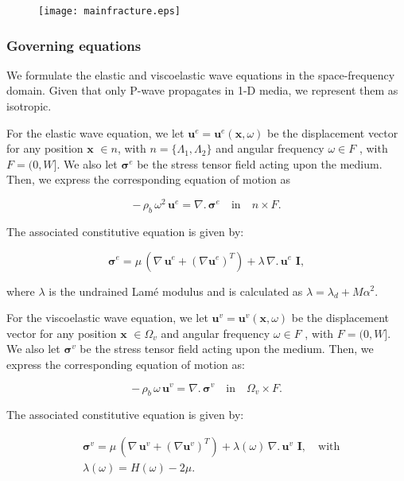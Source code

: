 \documentclass[draft]{agujournal2019}
\begin{document}
 \begin{figure}[!ht]
\centering
        \texttt{[image: mainfracture.eps]}
\caption{
}
\label{fig.3}
\end{figure}

\subsubsection{Governing equations}
We formulate the elastic and viscoelastic wave equations in the space-frequency domain. Given that only P-wave propagates in  1-D media, we represent them as isotropic.

For the elastic wave equation, we let $\bm{u}^e=\bm{u}^e (\bm{x},\omega)$ be the displacement vector for any position $\bm{x}$ $\in n$, with  $n= \{\Lambda_1, \Lambda_2\} $ and angular frequency  $\omega \in F$ , with $F =(0,W]$. We also let $\bm{\sigma}^e$ be the stress tensor field acting upon the medium. Then, we express the corresponding equation of motion as
\begin{linenomath*}
\begin{equation}\label{Eq.6}
- \, \rho_b \,\omega^2 \, \bm{u}^e = \nabla . \, \bm{\sigma}^e \quad  \textrm{in} \quad n \times F.
\end{equation}
\end{linenomath*}
The associated constitutive equation is given by: 
\begin{linenomath*}
\begin{equation}\label{Eq.7}
\bm{\sigma}^e = \mu \,  \left( \nabla \, \bm{u}^e + ({\nabla  \bm{u}^e})^T  \right) + \lambda \,  \nabla . \, \bm{u}^e\,\, \bm{I},
\end{equation}
\end{linenomath*}
where $\lambda$ is the undrained Lamé modulus and is calculated as $\lambda = \lambda_d + M \alpha^2$.

For the viscoelastic wave equation, we let $\bm{u}^v=\bm{u}^v (\bm{x},\omega)$ be the displacement vector for any position $\bm{x}$  $ \in \Omega_v$ and angular frequency $\omega \in F$ , with $F =(0,W]$. We also let $\bm{\sigma}^v$ be the stress tensor field acting upon the medium. Then, we express the corresponding equation of motion as:
\begin{linenomath*}
\begin{equation}\label{Eq.6}
- \, \rho_b \,\omega \, \bm{u}^v = \nabla . \, \bm{\sigma}^v \quad \textrm{in} \quad \Omega_v \times F.
\end{equation}
\end{linenomath*}
The associated constitutive equation is given by: 
\begin{linenomath*}
\begin{equation}\label{Eq.7}
\begin{split}
& \bm{\sigma}^v = \mu \,  \left( \nabla \, \bm{u}^v + ({\nabla  \bm{u}^v})^T  \right) + \lambda(\omega) \,  \nabla . \, \bm{u}^v\,\, \bm{I}, \quad \text{with} \\
& \lambda(\omega)= H(\omega)-2\mu.
\end{split}
\end{equation}
\end{linenomath*}
\end{document}
